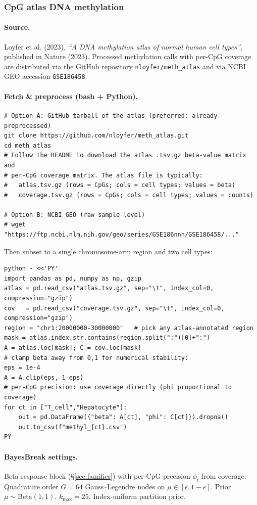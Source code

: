 \subsubsection{CpG atlas DNA methylation}
\label{app:real-data-methylation}

\paragraph{Source.}
Loyfer et al. (2023), \emph{``A DNA methylation atlas of normal human cell types''}, published in
Nature (2023). Processed methylation calls with per-CpG coverage are distributed via the GitHub
repository \texttt{nloyfer/meth\_atlas} and via NCBI GEO accession \texttt{GSE186458}.

\paragraph{Fetch \& preprocess (bash + Python).}
\begin{verbatim}
# Option A: GitHub tarball of the atlas (preferred: already preprocessed)
git clone https://github.com/nloyfer/meth_atlas.git
cd meth_atlas
# Follow the README to download the atlas .tsv.gz beta-value matrix and
# per-CpG coverage matrix. The atlas file is typically:
#   atlas.tsv.gz (rows = CpGs; cols = cell types; values = beta)
#   coverage.tsv.gz (rows = CpGs; cols = cell types; values = counts)

# Option B: NCBI GEO (raw sample-level)
# wget "https://ftp.ncbi.nlm.nih.gov/geo/series/GSE186nnn/GSE186458/..."
\end{verbatim}
Then subset to a single chromosome-arm region and two cell types:
\begin{verbatim}
python - <<'PY'
import pandas as pd, numpy as np, gzip
atlas = pd.read_csv("atlas.tsv.gz", sep="\t", index_col=0, compression="gzip")
cov   = pd.read_csv("coverage.tsv.gz", sep="\t", index_col=0, compression="gzip")
region = "chr1:20000000-30000000"   # pick any atlas-annotated region
mask = atlas.index.str.contains(region.split(":")[0]+":")
A = atlas.loc[mask]; C = cov.loc[mask]
# clamp beta away from 0,1 for numerical stability:
eps = 1e-4
A = A.clip(eps, 1-eps)
# per-CpG precision: use coverage directly (phi proportional to coverage)
for ct in ["T_cell","Hepatocyte"]:
    out = pd.DataFrame({"beta": A[ct], "phi": C[ct]}).dropna()
    out.to_csv(f"methyl_{ct}.csv")
PY
\end{verbatim}

\paragraph{BayesBreak settings.}
Beta-response block (\S\ref{sec:families}) with per-CpG precision $\phi_t$ from coverage.
Quadrature order $G=64$ Gauss--Legendre nodes on $\mu\in[\epsilon,1-\epsilon]$. Prior
$\mu\sim\mathrm{Beta}(1,1)$. $k_{\max}=25$. Index-uniform partition prior.

